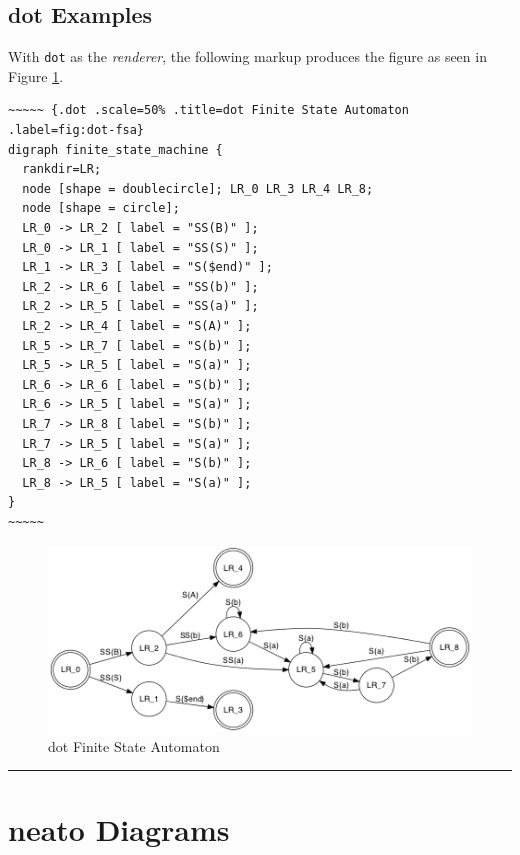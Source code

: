 \documentclass[]{article}
\begin{document}
\subsection{dot Examples}\label{dot-examples}

With \texttt{dot} as the \emph{renderer}, the following markup produces
the figure as seen in Figure \ref{fig:dot-fsa}.

\scriptsize

\begin{verbatim}
~~~~~ {.dot .scale=50% .title=dot Finite State Automaton .label=fig:dot-fsa}
digraph finite_state_machine {
  rankdir=LR;
  node [shape = doublecircle]; LR_0 LR_3 LR_4 LR_8;
  node [shape = circle];
  LR_0 -> LR_2 [ label = "SS(B)" ];
  LR_0 -> LR_1 [ label = "SS(S)" ];
  LR_1 -> LR_3 [ label = "S($end)" ];
  LR_2 -> LR_6 [ label = "SS(b)" ];
  LR_2 -> LR_5 [ label = "SS(a)" ];
  LR_2 -> LR_4 [ label = "S(A)" ];
  LR_5 -> LR_7 [ label = "S(b)" ];
  LR_5 -> LR_5 [ label = "S(a)" ];
  LR_6 -> LR_6 [ label = "S(b)" ];
  LR_6 -> LR_5 [ label = "S(a)" ];
  LR_7 -> LR_8 [ label = "S(b)" ];
  LR_7 -> LR_5 [ label = "S(a)" ];
  LR_8 -> LR_6 [ label = "S(b)" ];
  LR_8 -> LR_5 [ label = "S(a)" ];
}
~~~~~
\end{verbatim}

\normalsize

\begin{figure}[htbp]
\centering
\includegraphics{tmp/ppp-render-_6_eB/image-4.png}
\caption{dot Finite State Automaton\label{fig:dot-fsa}}
\end{figure}

\begin{center}\rule{3in}{0.4pt}\end{center}

\newpage

\section{neato Diagrams}\label{neato-diagrams}
\end{document}
